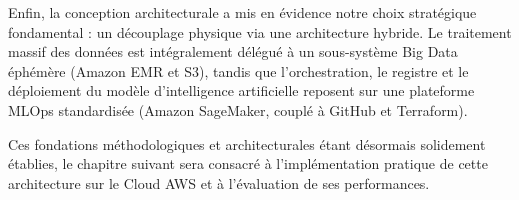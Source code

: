 Enfin, la conception architecturale a mis en évidence notre choix stratégique fondamental : un découplage physique via une architecture hybride. Le traitement massif des données est intégralement délégué à un sous-système Big Data éphémère (Amazon EMR et S3), tandis que l'orchestration, le registre et le déploiement du modèle d'intelligence artificielle reposent sur une plateforme MLOps standardisée (Amazon SageMaker, couplé à GitHub et Terraform). 

Ces fondations méthodologiques et architecturales étant désormais solidement établies, le chapitre suivant sera consacré à l'implémentation pratique de cette architecture sur le Cloud AWS et à l'évaluation de ses performances.

